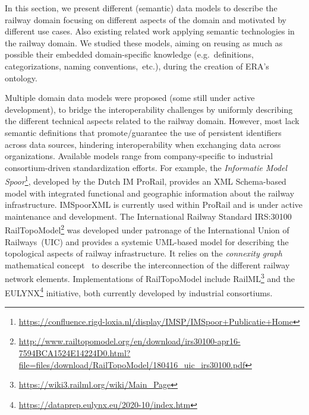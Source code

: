 In this section, we present different (semantic) data models
to describe the railway domain focusing on different aspects of the domain
and motivated by different use cases.
Also existing related work
applying semantic technologies in the railway domain.
We studied these models,
aiming on reusing as much as possible
their embedded domain-specific knowledge (e.g.~definitions, categorizations, naming conventions,~etc.),
during the creation of ERA's ontology.

Multiple domain data models were proposed (some still under active development),
to bridge the interoperability challenges
by uniformly describing the different technical aspects related to the railway domain.
However, most lack semantic definitions
that promote/guarantee the use of persistent identifiers across data sources,
hindering interoperability when exchanging data across organizations.
Available models range from company-specific
to industrial consortium-driven standardization efforts.
For example, the \textit{Informatie Model Spoor}\footnote{\url{https://confluence.rigd-loxia.nl/display/IMSP/IMSpoor+Publicatie+Home}},
developed by the Dutch IM ProRail,
provides an XML Schema-based model with integrated
functional and geographic information about the railway infrastructure.
IMSpoorXML is currently used within ProRail
and is under active maintenance and development.
The International Railway Standard IRS:30100 RailTopoModel\footnote{\url{http://www.railtopomodel.org/en/download/irs30100-apr16-7594BCA1524E14224D0.html?file=files/download/RailTopoModel/180416_uic_irs30100.pdf}} \cite{irs30100}
was developed under patronage of the International Union of Railways~(UIC)
and provides a systemic UML-based model
for describing the topological aspects of railway infrastructure.
It relies on the \textit{connexity graph} mathematical concept~\cite{gely2010}
to describe the interconnection of the different railway network elements.
Implementations of RailTopoModel include
RailML\footnote{\url{https://wiki3.railml.org/wiki/Main_Page}} \cite{hlubucek2017}
and the EULYNX\footnote{\url{https://dataprep.eulynx.eu/2020-10/index.htm}} initiative,
both currently developed by industrial consortiums.

